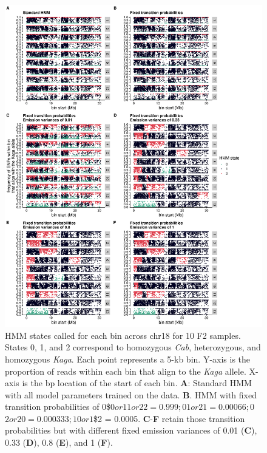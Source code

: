 \documentclass[
]{book}
\begin{document}
\begin{figure}
\includegraphics[width=1\linewidth]{figs/somites/scatter_collage} \caption{HMM states called for each bin across chr18 for 10 F2 samples. States 0, 1, and 2 correspond to homozygous \emph{Cab}, heterozygous, and homozygous \emph{Kaga}. Each point represents a 5-kb bin. Y-axis is the proportion of reads within each bin that align to the \emph{Kaga} allele. X-axis is the bp location of the start of each bin. \textbf{A}: Standard HMM with all model parameters trained on the data. \textbf{B}. HMM with fixed transition probabilities of 0\$\rightarrow\(0 or 1\)\rightarrow\(1 or 2\)\rightarrow\(2 = 0.999; 0\)\rightarrow\(1 or 2\)\rightarrow\(1 = 0.00066; 0\)\rightarrow\(2 or 2\)\rightarrow\(0 = 0.000333; 1\)\rightarrow\(0 or 1\)\rightarrow\$2 = 0.0005. \textbf{C}-\textbf{F} retain those transition probabilities but with different fixed emission variances of 0.01 (\textbf{C}), 0.33 (\textbf{D}), 0.8 (\textbf{E}), and 1 (\textbf{F}).}\label{fig:hmm-scat}
\end{figure}
\end{document}
